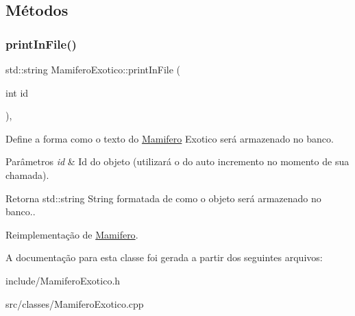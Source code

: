 \subsection{Métodos}
\mbox{\label{classMamiferoExotico_a4ee6f5f4a2917cfdf54304525add0c4a}} 
\subsubsection{\texorpdfstring{print\+In\+File()}{printInFile()}}
{\footnotesize\ttfamily std\+::string Mamifero\+Exotico\+::print\+In\+File (\begin{DoxyParamCaption}\item[{int}]{id }\end{DoxyParamCaption})\hspace{0.3cm}{\ttfamily [protected]}, {\ttfamily [virtual]}}



Define a forma como o texto do \hyperlink{classMamifero}{Mamifero} Exotico será armazenado no banco. 


\begin{DoxyParams}{Parâmetros}
{\em id} & Id do objeto (utilizará o do auto incremento no momento de sua chamada). \\
\hline
\end{DoxyParams}
\begin{DoxyReturn}{Retorna}
std\+::string String formatada de como o objeto será armazenado no banco.. 
\end{DoxyReturn}


Reimplementação de \hyperlink{classMamifero_a88e6c2efe9180611486f82d4dbf308ba}{Mamifero}.



A documentação para esta classe foi gerada a partir dos seguintes arquivos\+:\begin{DoxyCompactItemize}
\item 
include/Mamifero\+Exotico.\+h\item 
src/classes/Mamifero\+Exotico.\+cpp\end{DoxyCompactItemize}
